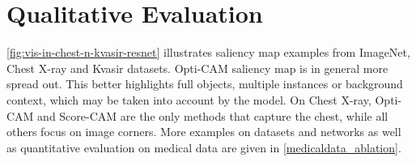 \section{Qualitative Evaluation}
\label{sec:oc_qual}
\autoref{fig:vis-in-chest-n-kvasir-resnet} illustrates saliency map examples from ImageNet, Chest 
X-ray and Kvasir datasets. Opti-CAM saliency map is in general more spread out. This better 
highlights full objects, multiple instances or background context, which may be taken into account 
by the model. On Chest X-ray, Opti-CAM and Score-CAM are the only methods that capture the chest, 
while all others focus on image corners. More examples on datasets and networks as well as 
quantitative evaluation on medical data are given in \autoref{medicaldata_ablation}.


